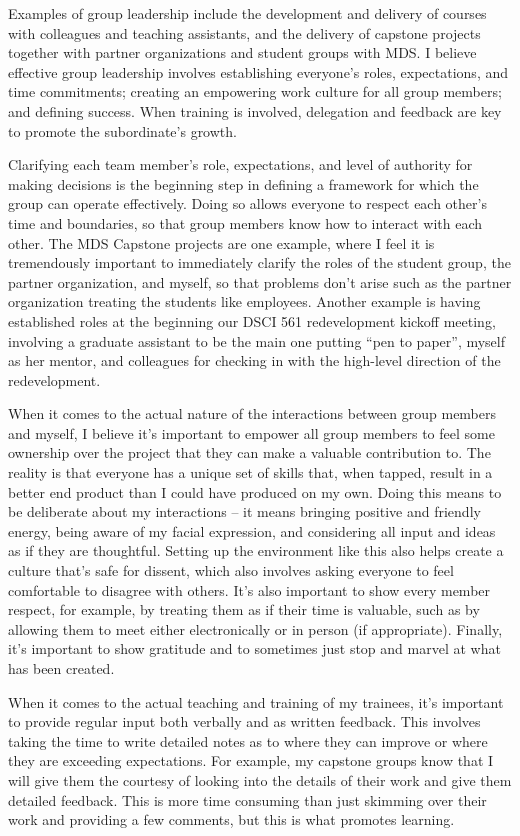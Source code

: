 \documentclass[]{article}
\begin{document}
Examples of group leadership include the development and delivery of courses with colleagues and teaching assistants, and the delivery of capstone projects together with partner organizations and student groups with MDS. I believe effective group leadership involves establishing everyone's roles, expectations, and time commitments; creating an empowering work culture for all group members; and defining success. When training is involved, delegation and feedback are key to promote the subordinate's growth.

Clarifying each team member's role, expectations, and level of authority for making decisions is the beginning step in defining a framework for which the group can operate effectively. Doing so allows everyone to respect each other's time and boundaries, so that group members know how to interact with each other. The MDS Capstone projects are one example, where I feel it is tremendously important to immediately clarify the roles of the student group, the partner organization, and myself, so that problems don't arise such as the partner organization treating the students like employees. Another example is having established roles at the beginning our DSCI 561 redevelopment kickoff meeting, involving a graduate assistant to be the main one putting ``pen to paper'', myself as her mentor, and colleagues for checking in with the high-level direction of the redevelopment.

When it comes to the actual nature of the interactions between group members and myself, I believe it's important to empower all group members to feel some ownership over the project that they can make a valuable contribution to. The reality is that everyone has a unique set of skills that, when tapped, result in a better end product than I could have produced on my own. Doing this means to be deliberate about my interactions -- it means bringing positive and friendly energy, being aware of my facial expression, and considering all input and ideas as if they are thoughtful. Setting up the environment like this also helps create a culture that's safe for dissent, which also involves asking everyone to feel comfortable to disagree with others. It's also important to show every member respect, for example, by treating them as if their time is valuable, such as by allowing them to meet either electronically or in person (if appropriate). Finally, it's important to show gratitude and to sometimes just stop and marvel at what has been created.

When it comes to the actual teaching and training of my trainees, it's important to provide regular input both verbally and as written feedback. This involves taking the time to write detailed notes as to where they can improve or where they are exceeding expectations. For example, my capstone groups know that I will give them the courtesy of looking into the details of their work and give them detailed feedback. This is more time consuming than just skimming over their work and providing a few comments, but this is what promotes learning.
\end{document}
